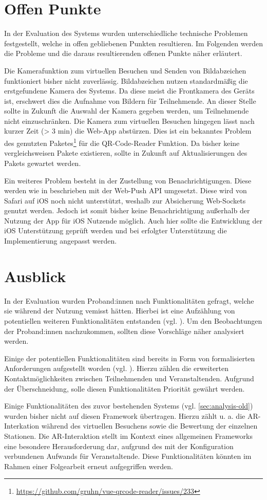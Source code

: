 \section{Offen Punkte}

In der Evaluation des Systems wurden unterschiedliche technische Problemen
festgestellt, welche in offen gebliebenen Punkten resultieren. Im Folgenden
werden die Probleme und die daraus resultierenden offenen Punkte näher
erläutert.

Die Kamerafunktion zum virtuellen Besuchen und Senden von Bildabzeichen
funktioniert bisher nicht zuverlässig. Bildabzeichen nutzen standardmäßig die
erstgefundene Kamera des Systems. Da diese meist die Frontkamera des Geräts ist,
erschwert dies die Aufnahme von Bildern für Teilnehmende. An dieser Stelle
sollte in Zukunft die Auswahl der Kamera gegeben werden, um Teilnehmende nicht
einzuschränken. Die Kamera zum virtuellen Besuchen hingegen lässt nach kurzer
Zeit (> 3 min) die Web-App abstürzen. Dies ist ein bekanntes Problem des
genutzten
Paketes\footnote{\url{https://github.com/gruhn/vue-qrcode-reader/issues/233}}
für die QR-Code-Reader Funktion. Da bisher keine vergleichsweisen Pakete
existieren, sollte in Zukunft auf Aktualisierungen des Pakets gewartet
werden.

Ein weiteres Problem besteht in der Zustellung von Benachrichtigungen. Diese
werden wie in  beschrieben mit der Web-Push API
umgesetzt. Diese wird von Safari auf iOS noch nicht unterstützt, weshalb zur
Absicherung Web-Sockets genutzt werden. Jedoch ist somit bisher keine
Benachrichtigung außerhalb der Nutzung der App für iOS Nutzende möglich. Auch
hier sollte die Entwicklung der iOS Unterstützung geprüft werden und bei
erfolgter Unterstützung die Implementierung angepasst werden.

\section{Ausblick}

In der Evaluation wurden Proband:innen nach Funktionalitäten gefragt, welche sie
während der Nutzung vemisst hätten. Hierbei ist eine Aufzählung von potentiellen
weiteren Funktionalitäten entstanden (vgl. ). Um
den Beobachtungen der Proband:innen nachzukommen, sollten diese Vorschläge näher
analysiert werden.

Einige der potentiellen Funktionalitäten sind bereits in Form von
formalisierten Anforderungen aufgestellt worden (vgl.
). Hierzu zählen die erweiterten
Kontaktmöglichkeiten zwischen Teilnehmenden und Veranstaltenden. Aufgrund der
Überschneidung, solle diesen Funktionalitäten Priorität gewährt werden.

Einige Funktionalitäten des zuvor bestehenden Systems (vgl.
\autoref{sec:analysis-old}) wurden bisher nicht auf diesen Framework übertragen.
Hierzu zählt u. a. die AR-Interkation während des virtuellen Besuchens sowie die
Bewertung der einzelnen Stationen. Die AR-Interaktion stellt im Kontext eines
allgemeinen Frameworks eine besondere Herausforderung dar, aufgrund des mit der
Konfiguration verbundenen Aufwands für Veranstaltende. Diese Funktionalitäten
könnten im Rahmen einer Folgearbeit erneut aufgegriffen werden.

